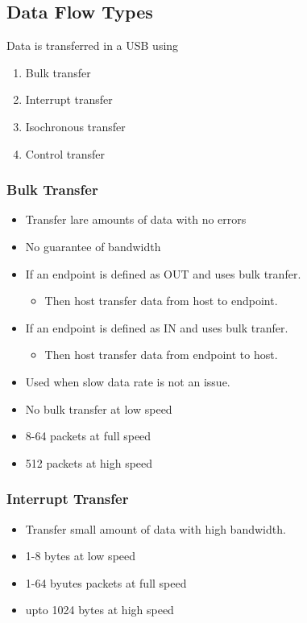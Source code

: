\documentclass{article}
\begin{document}
\subsection{Data Flow Types}
Data is transferred in a USB using
\begin{enumerate}
    \item Bulk transfer
    \item Interrupt transfer
    \item Isochronous transfer
    \item Control transfer
\end{enumerate}

\subsubsection{Bulk Transfer}
\begin{itemize}
    \item Transfer lare amounts of data with no errors
    \item No guarantee of bandwidth
    \item If an endpoint is defined as OUT and uses bulk tranfer.
          \begin{itemize}
              \item Then host transfer data from host to endpoint.
          \end{itemize}
    \item If an endpoint is defined as IN and uses bulk tranfer.
          \begin{itemize}
              \item Then host transfer data from endpoint to host.
          \end{itemize}
    \item Used when slow data rate is not an issue.
    \item No bulk transfer at low speed
    \item 8-64 packets at full speed
    \item 512 packets at high speed
\end{itemize}

\subsubsection{Interrupt Transfer}
\begin{itemize}
    \item Transfer small amount of data with high bandwidth.
    \item 1-8 bytes at low speed
    \item 1-64 byutes packets at full speed
    \item upto 1024 bytes at high speed
\end{itemize}
\end{document}
